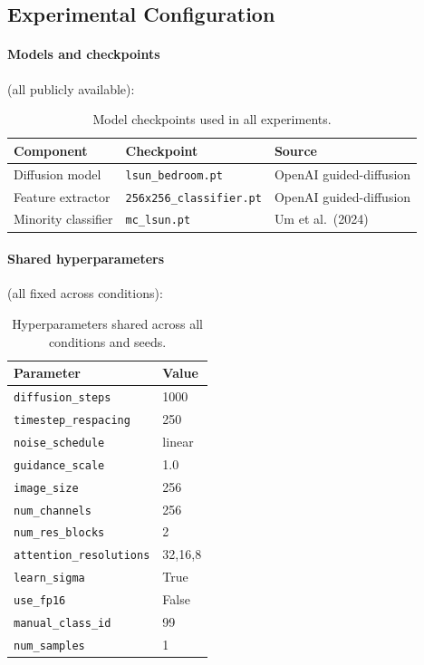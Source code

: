 \documentclass[10pt]{article}
\begin{document}
\subsection{Experimental Configuration}
\label{sec:config}

\paragraph{Models and checkpoints} (all publicly available):

\begin{table}[h]
\centering
\caption{Model checkpoints used in all experiments.}
\renewcommand{\arraystretch}{1.1}
\begin{tabular}{@{}lll@{}}
\toprule
\textbf{Component} & \textbf{Checkpoint} & \textbf{Source} \\
\midrule
Diffusion model     & \texttt{lsun\_bedroom.pt}     & OpenAI guided-diffusion \\
Feature extractor   & \texttt{256x256\_classifier.pt} & OpenAI guided-diffusion \\
Minority classifier & \texttt{mc\_lsun.pt}          & Um et al.\ (2024) \\
\bottomrule
\end{tabular}
\end{table}

\paragraph{Shared hyperparameters} (all fixed across conditions):

\begin{table}[h]
\centering
\caption{Hyperparameters shared across all conditions and seeds.}
\renewcommand{\arraystretch}{1.1}
\begin{tabular}{@{}ll@{}}
\toprule
\textbf{Parameter} & \textbf{Value} \\
\midrule
\texttt{diffusion\_steps}       & 1000 \\
\texttt{timestep\_respacing}    & 250 \\
\texttt{noise\_schedule}        & linear \\
\texttt{guidance\_scale}        & 1.0 \\
\texttt{image\_size}            & 256 \\
\texttt{num\_channels}          & 256 \\
\texttt{num\_res\_blocks}        & 2 \\
\texttt{attention\_resolutions} & 32,16,8 \\
\texttt{learn\_sigma}           & True \\
\texttt{use\_fp16}              & False \\
\texttt{manual\_class\_id}      & 99 \\
\texttt{num\_samples}           & 1 \\
\bottomrule
\end{tabular}
\end{table}
\end{document}
